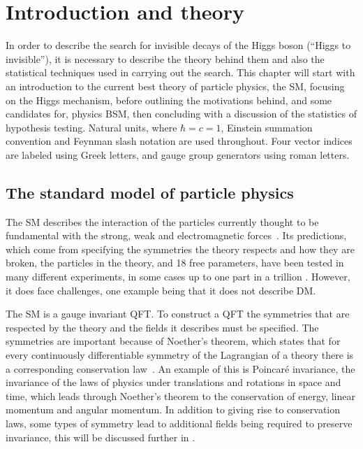 \chapter{Introduction and theory}
\label{chap:theory}
In order to describe the search for invisible decays of the Higgs boson (``Higgs to invisible''), it is necessary to describe the theory behind them and also the statistical techniques used in carrying out the search. This chapter will start with an introduction to the current best theory of particle physics, the \ac{SM}, focusing on the Higgs mechanism, before outlining the motivations behind, and some candidates for, physics \ac{BSM}, then concluding with a discussion of the statistics of hypothesis testing. Natural units, where $\hbar=c=1$, Einstein summation convention and Feynman slash notation are used throughout. Four vector indices are labeled using Greek letters, and gauge group generators using roman letters.


\section{The standard model of particle physics}
\label{sec:SM}
The SM describes the interaction of the particles currently thought to be fundamental with the strong, weak and electromagnetic forces~\cite{GlashowPartialSymmetries,WeinbergModelOfLeptons,SalamNobelSymposium}. Its predictions, which come from specifying the symmetries the theory respects and how they are broken, the particles in the theory, and 18 free parameters, have been tested in many different experiments, in some cases up to one part in a trillion \cite{PhysRevLett.100.120801}. However, it does face challenges, one example being that it does not describe \ac{DM}. 

The SM is a gauge invariant \ac{QFT}. To construct a QFT the symmetries that are respected by the theory and the fields it describes must be specified. The symmetries are important because of Noether's theorem, which states that for every continuously differentiable symmetry of the Lagrangian of a theory there is a corresponding conservation law~\cite{Noether:1918zz,doi:10.1080/00411457108231446}. An example of this is Poincar\'e invariance, the invariance of the laws of physics under translations and rotations in space and time, which leads through Noether's theorem to the conservation of energy, linear momentum and angular momentum. In addition to giving rise to conservation laws, some types of symmetry lead to additional fields being required to preserve invariance, this will be discussed further in  \cite{PhysRev.96.191}.

